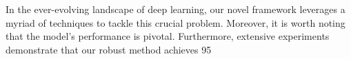 In the ever-evolving landscape of deep learning, our novel framework leverages a myriad of techniques to tackle this crucial problem. Moreover, it is worth noting that the model's performance is pivotal. Furthermore, extensive experiments demonstrate that our robust method achieves 95%
